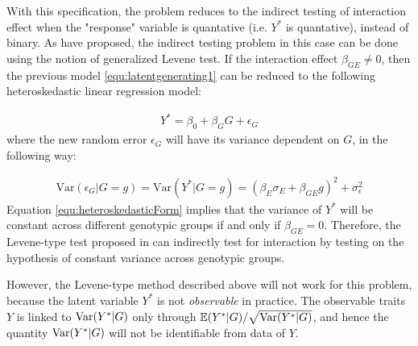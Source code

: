 With this specification, the problem reduces to the indirect testing of interaction effect when the "response" variable is quantative (i.e. $Y^*$ is quantative), instead of binary. As \citet{gjlst} have proposed, the indirect testing problem in this case can be done using the notion of generalized Levene test. If the interaction effect $\beta_{GE} \neq 0$, then the previous model \ref{equ:latentgenerating1} can be reduced to the following heteroskedastic linear regression model:

\begin{equation}\label{equ:heteroskedasticLM}
\begin{aligned}
Y^* = \beta_0 + \beta_GG + \epsilon_G
\end{aligned}
\end{equation}
where the new random error $\epsilon_G$ will have its variance dependent on $G$, in the following way:

\begin{equation}\label{equ:heteroskedasticForm}
\begin{aligned}
\text{Var}(\epsilon_G | G = g) = \text{Var}(Y^* | G = g) = (\beta_E \sigma_E + \beta_{GE} g)^2 + \sigma_\epsilon^2
\end{aligned}
\end{equation}
Equation \ref{equ:heteroskedasticForm} implies that the variance of $Y^*$ will be constant across different genotypic groups if and only if $\beta_{GE} = 0$. Therefore, the Levene-type test proposed in \citep{gjlst,jlst} can indirectly test for interaction by testing on the hypothesis of constant variance across genotypic groups.

However, the Levene-type method described above will not work for this problem, because the latent variable $Y^*$ is not \textit{observable} in practice. The observable traits $Y$ is linked to $\text{Var}(Y^*|G)$ only through $\mathbb{E}(Y^*|G)/\sqrt{\text{Var}(Y^*|G)}$, and hence the quantity $\text{Var}(Y^*|G)$ will not be identifiable from data of $Y$.